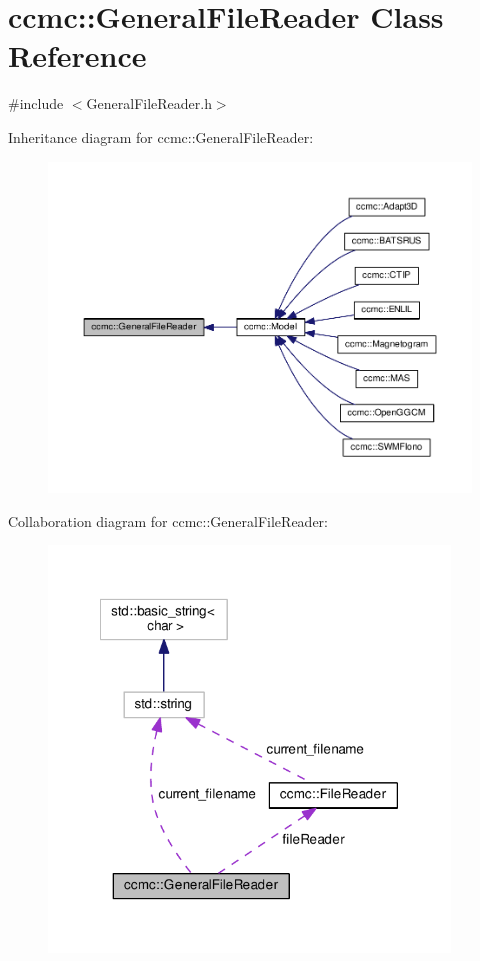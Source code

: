 \hypertarget{classccmc_1_1_general_file_reader}{\section{ccmc\-:\-:General\-File\-Reader Class Reference}
\label{classccmc_1_1_general_file_reader}
}


{\ttfamily \#include $<$General\-File\-Reader.\-h$>$}



Inheritance diagram for ccmc\-:\-:General\-File\-Reader\-:
\nopagebreak
\begin{figure}[H]
\begin{center}
\leavevmode
\includegraphics[width=350pt]{classccmc_1_1_general_file_reader__inherit__graph}
\end{center}
\end{figure}


Collaboration diagram for ccmc\-:\-:General\-File\-Reader\-:
\nopagebreak
\begin{figure}[H]
\begin{center}
\leavevmode
\includegraphics[width=302pt]{classccmc_1_1_general_file_reader__coll__graph}
\end{center}
\end{figure}
